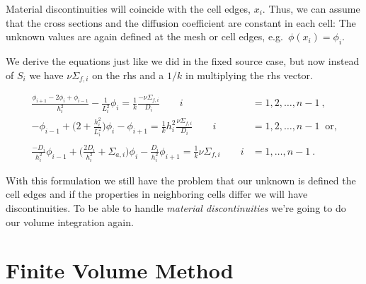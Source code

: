 \documentclass[12pt]{article}
\begin{document}
Material discontinuities will coincide with the cell edges, $x_i$. Thus, we can assume that the cross sections and the diffusion coefficient are constant in each cell:
%
%
The unknown values are again defined at the mesh or cell edges, e.g.\ $\phi(x_i) = \phi_i$.

We derive the equations just like we did in the fixed source case, but now instead of $S_i$ we have $\nu \Sigma_{f,i}$ on the rhs and a $1/k$ in multiplying the rhs vector.

\begin{align}
\frac{\phi_{i+1} - 2\phi_i + \phi_{i-1}}{h_i^2} - \frac{1}{L_i^2}\phi_i = \frac{1}{k}\frac{-\nu\Sigma_{f,i}}{D_i} \qquad i &= 1, 2, \dots, n-1 \:,\nonumber \\
%
-\phi_{i-1} + \bigl(2 + \frac{h_i^2}{L_i^2}\bigr)\phi_i - \phi_{i+1} = \frac{1}{k} h_i^2 \frac{\nu\Sigma_{f,i}}{D_i} \qquad i &= 1, 2, \dots, n-1\: \text{ or,} \nonumber\\
%
\nonumber \\
\frac{-D_i}{h_i^2}\phi_{i-1} + \biggl(\frac{2D_i}{h_i^2} + \Sigma_{a,i} \biggr)\phi_i - \frac{D_i}{h_i^2}\phi_{i+1} = \frac{1}{k} \nu\Sigma_{f,i} \qquad i &= 1, \dots, n-1 \:.\nonumber 
\end{align}

With this formulation we still have the problem that our unknown is defined the cell edges and if the properties in neighboring cells differ we will have discontinuities. To be able to handle \textit{material discontinuities} we're going to do our volume integration again.


\section*{Finite Volume Method}
\end{document}
